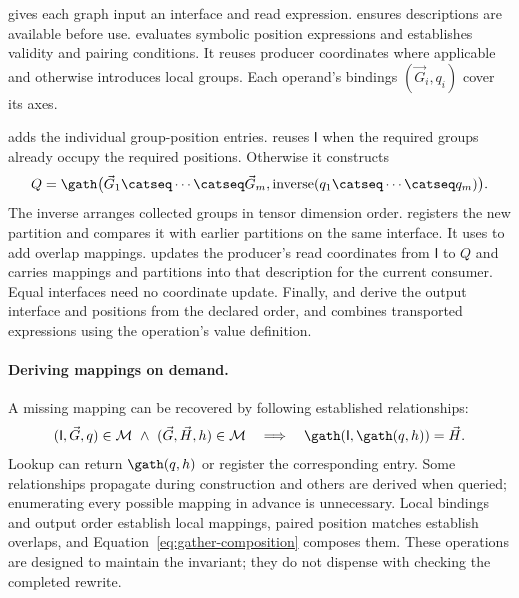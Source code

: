  gives each graph input an interface and read
expression.  ensures descriptions are available before
use.  evaluates symbolic position expressions and
establishes validity and pairing conditions. It reuses producer coordinates
where applicable and otherwise introduces local groups. Each operand's
bindings $(\vec G_i,q_i)$ cover its axes.

 adds the individual group-position entries.
 reuses $\mathsf{I}$ when the required groups already occupy the
required positions. Otherwise it constructs
\begin{equation}
 Q=\gath\bigl(\vec G_1\catseq\cdots\catseq \vec G_m,
        \operatorname{inverse}(q_1\catseq\cdots\catseq q_m)\bigr).
\end{equation}
The inverse arranges collected groups in tensor dimension order.
 registers the new partition and compares it
with earlier partitions on the same interface. It uses 
to add overlap mappings.  updates the producer's read
coordinates from $\mathsf{I}$ to $Q$ and carries mappings and partitions into that
description for the current consumer. Equal interfaces need no coordinate
update. Finally,  and  derive the
output interface and positions from the declared order, and 
combines transported expressions using the operation's value definition.

\paragraph{Deriving mappings on demand.}
A missing mapping can be recovered by following established relationships:
\begin{equation}
\begin{aligned}
 (\mathsf{I},\vec G,q)\in \mathcal M\ \land\ (\vec G,\vec H,h)\in \mathcal M
 \quad\Longrightarrow\quad
 \gath(\mathsf{I},\gath(q,h))=\vec H.
\end{aligned}
\end{equation}
Lookup can return $\gath(q,h)$ or register the corresponding entry. Some
relationships propagate during construction and others are derived when
queried; enumerating every possible mapping in advance is unnecessary.
Local bindings and output order establish local mappings, paired position
matches establish overlaps, and Equation~\eqref{eq:gather-composition}
composes them. These operations are designed to maintain the invariant;
they do not dispense with checking the completed rewrite.


